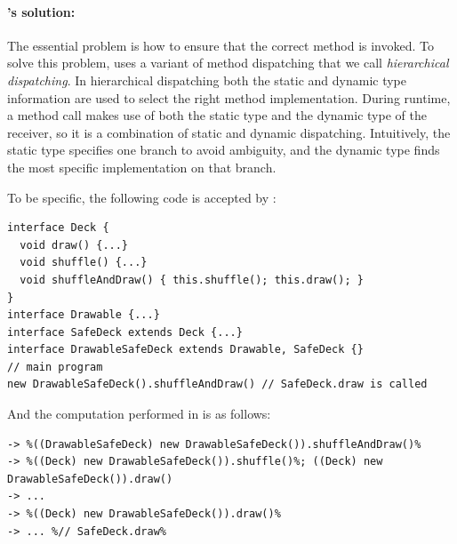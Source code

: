 \paragraph{\MIM's solution:} 
The essential problem is how to ensure that the correct method is
invoked. To solve this problem, \MIM{} uses a variant of method
dispatching that we call \textit{hierarchical dispatching}. In
hierarchical dispatching both the static and dynamic type information 
are used to select the right method implementation.
During runtime, a method call
makes use of both the static type and the dynamic type of the
receiver, so it is a
combination of static and dynamic dispatching. Intuitively, the static type specifies one branch
to avoid ambiguity, and the dynamic type finds the most specific implementation on that branch.

To be specific, the following code is accepted by \MIM{}:
\vspace{3pt}\begin{lstlisting}
interface Deck {
  void draw() {...}
  void shuffle() {...}
  void shuffleAndDraw() { this.shuffle(); this.draw(); }
}
interface Drawable {...}
interface SafeDeck extends Deck {...}
interface DrawableSafeDeck extends Drawable, SafeDeck {}
// main program
new DrawableSafeDeck().shuffleAndDraw() // SafeDeck.draw is called
\end{lstlisting}\vspace{3pt}
And the computation performed in \MIM{} is as follows:
\vspace{3pt}\begin{lstlisting}[style=reduction, escapechar=\%]
   %new DrawableSafeDeck()%.shuffleAndDraw()
-> %((DrawableSafeDeck) new DrawableSafeDeck()).shuffleAndDraw()%
-> %((Deck) new DrawableSafeDeck()).shuffle()%; ((Deck) new DrawableSafeDeck()).draw()
-> ...
-> %((Deck) new DrawableSafeDeck()).draw()%
-> ... %// SafeDeck.draw%
\end{lstlisting}\vspace{3pt}

